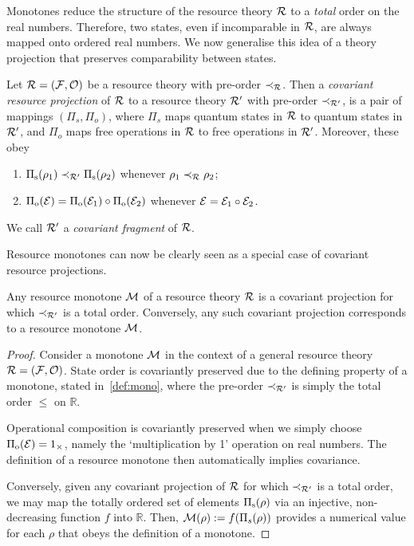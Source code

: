 \documentclass[pra,
aps,
twocolumn,
superscriptaddress,
groupedaddress,
nofootinbib,
reprint
]{revtex4-1}
\begin{document}
Monotones reduce the structure of the resource theory $\mathcal{R}$ to a \emph{total} order on the real numbers.
Therefore, two states, even if incomparable in $\mathcal{R}$, are always mapped onto ordered real numbers.
We now generalise this idea of a theory projection that preserves comparability between states. 
\begin{definition}\label{def:covproj}
Let $\mathcal{R} = (\mathcal{F}, \mathcal{O})$ be a resource theory with pre-order $\prec_{\mathcal{R}}$. 
Then a \emph{covariant resource projection} of $\mathcal{R}$ to a resource theory $\mathcal{R}'$ with pre-order $\prec_{\mathcal{R}'}$, is a pair of mappings $(\Pi_s, \Pi_o)$, where $\Pi_s$ maps quantum states in $\mathcal{R}$ to quantum states in $\mathcal{R}'$, and $\Pi_o$ maps free operations in $\mathcal{R}$ to free operations in $\mathcal{R}'$. 
Moreover, these obey
	\begin{enumerate}
        \item $\Pi_{\rm{s}}(\rho_1) \prec_{\mathcal{R}'} \Pi_{\rm{s}}(\rho_2)$ whenever $\rho_1 \prec_{\mathcal{R}} \rho_2$;
        \item $\Pi_{\rm{o}}(\mathcal{E}) = \Pi_{\rm{o}}(\mathcal{E}_1) \circ \Pi_{\rm{o}}(\mathcal{E}_2)$ whenever $\mathcal{E} = \mathcal{E}_1 \circ \mathcal{E}_2$.
    \end{enumerate}
We call $\mathcal{R}'$ a \emph{covariant fragment} of $\mathcal{R}$.
\end{definition}

Resource monotones can now be clearly seen as a special case of covariant resource projections.
\begin{proposition}\label{thm:monoproj}
	Any resource monotone $\mathcal{M}$ of a resource theory $\mathcal{R}$ is a covariant projection for which $\prec_{\mathcal{R}'}$ is a total order. 
	Conversely, any such covariant projection corresponds to a resource monotone $\mathcal{M}$. 
\end{proposition}
\begin{proof}
	Consider a monotone $\mathcal{M}$ in the context of a general resource theory $\mathcal{R} = (\mathcal{F}, \mathcal{O})$.
	State order is covariantly preserved due to the defining property of a monotone, stated in~\cref{def:mono}, where the pre-order $\prec_{\mathcal{R}'}$ is simply the total order $\leq$ on $\mathbb{R}$. 
	
	Operational composition is covariantly preserved when we simply choose $\Pi_{\rm{o}}(\mathcal{E}) = 1_\times$, namely the `multiplication by 1' operation on real numbers. 
	The definition of a resource monotone then automatically implies covariance.
	
	Conversely, given any covariant projection of $\mathcal{R}$ for which $\prec_{\mathcal{R}'}$ is a total order, we may map the totally ordered set of elements $\Pi_{\rm{s}}(\rho)$ via an injective, non-decreasing function $f$ into $\mathbb{R}$. 
	Then, $\mathcal{M}(\rho):=f(\Pi_s(\rho))$ provides a numerical value for each $\rho$ that obeys the definition of a monotone.
	
\end{proof}
\end{document}
